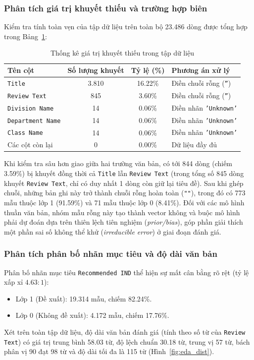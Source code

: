 \subsubsection{Phân tích giá trị khuyết thiếu và trường hợp biên}
Kiểm tra tính toàn vẹn của tập dữ liệu trên toàn bộ 23.486 dòng được tổng hợp trong Bảng~\ref{tab:missing_values}:
\begin{table}[H]
\centering
\renewcommand{\arraystretch}{1.15}
\begin{tabular}{|l|c|c|l|}
\hline
\textbf{Tên cột} & \textbf{Số lượng khuyết} & \textbf{Tỷ lệ (\%)} & \textbf{Phương án xử lý} \\ \hline
\texttt{Title} & 3.810 & 16.22\% & Điền chuỗi rỗng (\texttt{''}) \\ \hline
\texttt{Review Text} & 845 & 3.60\% & Điền chuỗi rỗng (\texttt{''}) \\ \hline
\texttt{Division Name} & 14 & 0.06\% & Điền nhãn \texttt{'Unknown'} \\ \hline
\texttt{Department Name} & 14 & 0.06\% & Điền nhãn \texttt{'Unknown'} \\ \hline
\texttt{Class Name} & 14 & 0.06\% & Điền nhãn \texttt{'Unknown'} \\ \hline
Các cột còn lại & 0 & 0.00\% & Dữ liệu đầy đủ \\ \hline
\end{tabular}
\caption{Thống kê giá trị khuyết thiếu trong tập dữ liệu}
\label{tab:missing_values}
\end{table}

Khi kiểm tra sâu hơn giao giữa hai trường văn bản, có tới 844 dòng (chiếm 3.59\%) bị khuyết đồng thời cả \texttt{Title} lẫn \texttt{Review Text} (trong tổng số 845 dòng khuyết \texttt{Review Text}, chỉ có duy nhất 1 dòng còn giữ lại tiêu đề). Sau khi ghép chuỗi, những bản ghi này trở thành chuỗi rỗng hoàn toàn (\texttt{""}), trong đó có 773 mẫu thuộc lớp 1 (91.59\%) và 71 mẫu thuộc lớp 0 (8.41\%). Đối với các mô hình thuần văn bản, nhóm mẫu rỗng này tạo thành vector không và buộc mô hình phải dự đoán dựa trên thiên lệch tiên nghiệm (\textit{prior/bias}), góp phần giải thích một phần sai số không thể khử (\textit{irreducible error}) ở giai đoạn đánh giá.

\subsubsection{Phân tích phân bố nhãn mục tiêu và độ dài văn bản}
Phân bố nhãn mục tiêu \texttt{Recommended IND} thể hiện sự mất cân bằng rõ rệt (tỷ lệ xấp xỉ $4.63 : 1$):
\begin{itemize}
    \item Lớp 1 (Đề xuất): 19.314 mẫu, chiếm 82.24\%.
    \item Lớp 0 (Không đề xuất): 4.172 mẫu, chiếm 17.76\%.
\end{itemize}
Xét trên toàn tập dữ liệu, độ dài văn bản đánh giá (tính theo số từ của \texttt{Review Text}) có giá trị trung bình 58.03 từ, độ lệch chuẩn 30.18 từ, trung vị 57 từ, bách phân vị 90 đạt 98 từ và độ dài tối đa là 115 từ (Hình~\ref{fig:eda_dist}).


